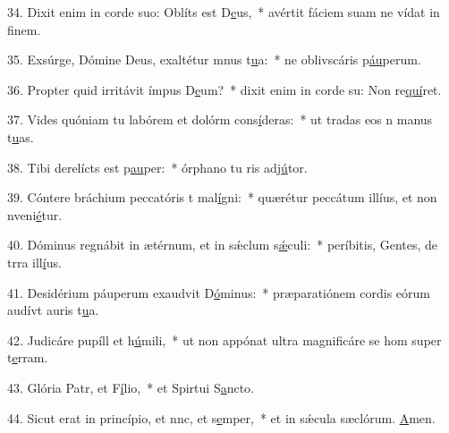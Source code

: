 34. Dixit enim in corde suo: Oblíts est D\uline{e}us,~* avértit fáciem suam ne vídat in f\uline{i}nem.\par 
35. Exsúrge, Dómine Deus, exaltétur mnus t\uline{u}a:~* ne oblivscáris p\uline{áu}perum.\par 
36. Propter quid irritávit ímpus D\uline{e}um?~* dixit enim in corde su: Non re\uline{quí}ret.\par 
37. Vides quóniam tu labórem et dolórm cons\uline{í}deras:~* ut tradas eos n manus t\uline{u}as.\par 
38. Tibi derelícts est p\uline{au}per:~* órphano tu ris adj\uline{ú}tor.\par 
39. Cóntere bráchium peccatóris t mal\uline{í}gni:~* quærétur peccátum illíus, et non nveni\uline{é}tur.\par 
40. Dóminus regnábit in ætérnum, et in sǽclum s\uline{ǽ}culi:~* períbitis, Gentes, de trra ill\uline{í}us.\par 
41. Desidérium páuperum exaudvit D\uline{ó}minus:~* præparatiónem cordis eórum audívt auris t\uline{u}a.\par 
42. Judicáre pupíll et h\uline{ú}mili,~* ut non appónat ultra magnificáre se hom super t\uline{e}rram.\par 
43. Glória Patr, et F\uline{í}lio,~* et Spirtui S\uline{a}ncto.\par 
44. Sicut erat in princípio, et nnc, et s\uline{e}mper,~* et in sǽcula sæclórum. \uline{A}men.\par 
